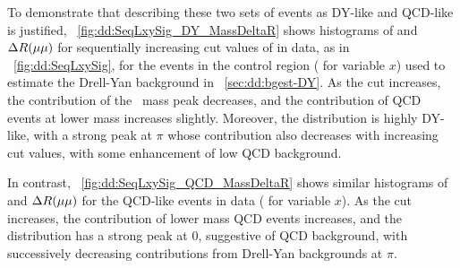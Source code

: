\pagebreak
To demonstrate that describing these two sets of events as DY-like and QCD-like is justified, \Fig~\ref{fig:dd:SeqLxySig_DY_MassDeltaR} shows histograms of \mMuMu and $\Delta R(\mathrm{\mu}\mathrm{\mu})$ for sequentially increasing cut values of \LxySig in data, as in \Fig~\ref{fig:dd:SeqLxySig}, for the events in the control region (\ie {} for variable $x$) used to estimate the Drell-Yan background in \Sec~\ref{sec:dd:bgest-DY}.
As the cut increases, the contribution of the \PZ\ mass peak decreases, and the contribution of QCD events at lower mass increases slightly.
Moreover, the \deltaR distribution is highly DY-like, with a strong peak at $\pi$ whose contribution also decreases with increasing \LxySig cut values, with some enhancement of low \deltaR QCD background.

In contrast, \Fig~\ref{fig:dd:SeqLxySig_QCD_MassDeltaR} shows similar histograms of \mMuMu and $\Delta R(\mathrm{\mu}\mathrm{\mu})$ for the QCD-like events in data (\ie {} for variable $x$).
As the cut increases, the contribution of lower mass QCD events increases, and the \deltaR distribution has a strong peak at 0, suggestive of QCD background, with successively decreasing contributions from Drell-Yan backgrounds at $\pi$.

